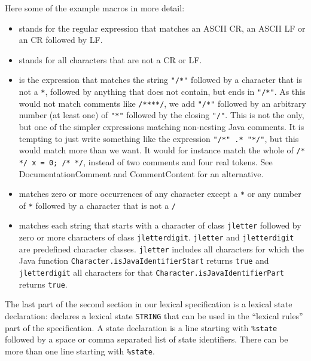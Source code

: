 \documentclass[11pt]{scrartcl}
\begin{document}
Here some of the example macros in more detail:
\begin{itemize}
\item
  \texttt{} stands for the regular
  expression that matches an ASCII CR, an ASCII LF or an CR followed by LF.

\item
  \texttt{} stands for all characters
  that are not a CR or LF.

\item
  \texttt{} is the expression
  that matches the string \texttt{"/*"} followed by a character that
  is not a \texttt{*}, followed by anything that does not contain, but
  ends in \texttt{"/*"}.  As this would not match comments like
  \texttt{/****/}, we add \texttt{"/*"} followed by an arbitrary
  number (at least one) of \texttt{"*"} followed by the closing
  \texttt{"/"}. This is not the only, but one of the simpler
  expressions matching non-nesting Java comments. It is tempting to
  just write something like the expression \texttt{"/*" .* "*/"}, but
  this would match more than we want. It would for instance match the
  whole of \texttt{/* */ x = 0; /* */}, instead of two comments and
  four real tokens. See DocumentationComment and CommentContent for an
  alternative.

\item
  \texttt{} matches zero or more
  occurrences of any character except a \texttt{*} or any number of 
  \texttt{*} followed by a character that is not a \texttt{/}

\item
  \texttt{} matches each string that
  starts with a character of class \texttt{jletter} followed by zero or more characters
  of class \texttt{jletterdigit}. \texttt{jletter} and \texttt{jletterdigit}
  are predefined character classes.  \texttt{jletter} includes all characters for which
  the Java function \texttt{Character.isJavaIdentifierStart} returns \texttt{true} and 
  \texttt{jletterdigit} all characters for that \texttt{Character.isJavaIdentifierPart}
  returns \texttt{true}. 
\end{itemize}
\label{ExampleStateDecl}

The last part of the second section in our
lexical specification is a lexical state declaration: 
\texttt{}
declares a lexical state \texttt{STRING} that can be
used in the ``lexical rules'' part of the specification. A state declaration
is a line starting with \texttt{\%state} followed by a space or comma
separated list of state identifiers. There can be more than one line starting
with \texttt{\%state}.
\end{document}
